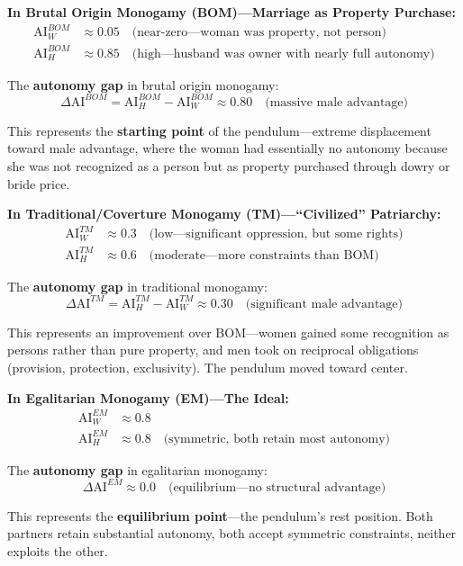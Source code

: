 \documentclass[12pt, letterpaper]{article}
\begin{document}
\textbf{In Brutal Origin Monogamy (BOM)---Marriage as Property Purchase:}
\begin{align*}
\text{AI}_W^{BOM} &\approx 0.05 \quad \text{(near-zero---woman was property, not person)} \\
\text{AI}_H^{BOM} &\approx 0.85 \quad \text{(high---husband was owner with nearly full autonomy)}
\end{align*}

The \textbf{autonomy gap} in brutal origin monogamy:
\[
\Delta \text{AI}^{BOM} = \text{AI}_H^{BOM} - \text{AI}_W^{BOM} \approx 0.80 \quad \text{(massive male advantage)}
\]

This represents the \textbf{starting point} of the pendulum---extreme displacement toward male advantage, where the woman had essentially no autonomy because she was not recognized as a person but as property purchased through dowry or bride price.

\textbf{In Traditional/Coverture Monogamy (TM)---``Civilized'' Patriarchy:}
\begin{align*}
\text{AI}_W^{TM} &\approx 0.3 \quad \text{(low---significant oppression, but some rights)} \\
\text{AI}_H^{TM} &\approx 0.6 \quad \text{(moderate---more constraints than BOM)}
\end{align*}

The \textbf{autonomy gap} in traditional monogamy:
\[
\Delta \text{AI}^{TM} = \text{AI}_H^{TM} - \text{AI}_W^{TM} \approx 0.30 \quad \text{(significant male advantage)}
\]

This represents an improvement over BOM---women gained some recognition as persons rather than pure property, and men took on reciprocal obligations (provision, protection, exclusivity). The pendulum moved toward center.

\textbf{In Egalitarian Monogamy (EM)---The Ideal:}
\begin{align*}
\text{AI}_W^{EM} &\approx 0.8 \\
\text{AI}_H^{EM} &\approx 0.8 \quad \text{(symmetric, both retain most autonomy)}
\end{align*}

The \textbf{autonomy gap} in egalitarian monogamy:
\[
\Delta \text{AI}^{EM} \approx 0.0 \quad \text{(equilibrium---no structural advantage)}
\]

This represents the \textbf{equilibrium point}---the pendulum's rest position. Both partners retain substantial autonomy, both accept symmetric constraints, neither exploits the other.
\end{document}
